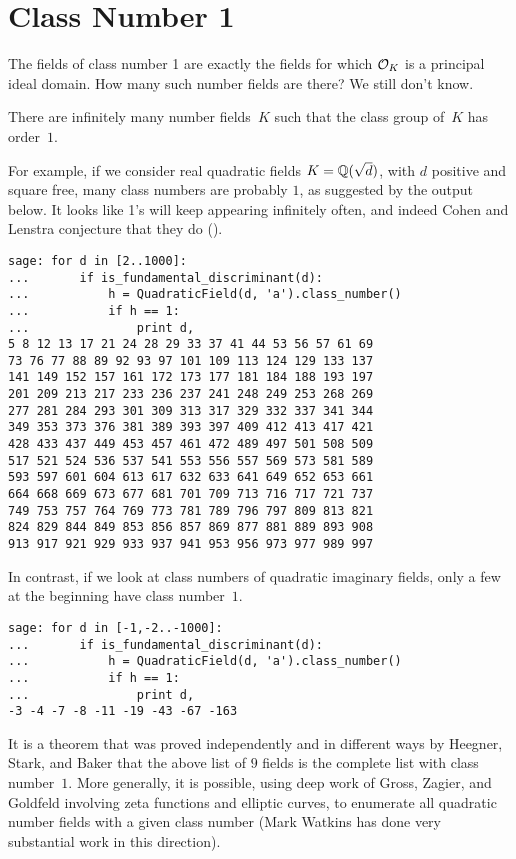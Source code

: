\section{Class Number 1}\label{sec:cn1}
The fields of class number 1 are exactly the fields for
which $\mathcal{O}_K$ is a principal ideal domain.  How many such
number fields are there?   We still don't know.
\begin{conjecture}
  There are infinitely many number fields~$K$ such that the class
  group of~$K$ has order~$1$.
\end{conjecture}
For example, if we consider real quadratic fields $K=\mathbb{Q}(\sqrt{d})$,
with $d$ positive and square free, many class numbers are probably $1$,
as suggested by the \magma{} output below.
It looks like 1's will keep appearing infinitely often, and indeed
Cohen and Lenstra conjecture that they do (\cite{cohen-lenstra:heuristics}).  
\begin{verbatim}
sage: for d in [2..1000]:
...       if is_fundamental_discriminant(d):
...           h = QuadraticField(d, 'a').class_number()
...           if h == 1:
...               print d, 
5 8 12 13 17 21 24 28 29 33 37 41 44 53 56 57 61 69 
73 76 77 88 89 92 93 97 101 109 113 124 129 133 137 
141 149 152 157 161 172 173 177 181 184 188 193 197 
201 209 213 217 233 236 237 241 248 249 253 268 269 
277 281 284 293 301 309 313 317 329 332 337 341 344 
349 353 373 376 381 389 393 397 409 412 413 417 421 
428 433 437 449 453 457 461 472 489 497 501 508 509 
517 521 524 536 537 541 553 556 557 569 573 581 589 
593 597 601 604 613 617 632 633 641 649 652 653 661 
664 668 669 673 677 681 701 709 713 716 717 721 737 
749 753 757 764 769 773 781 789 796 797 809 813 821 
824 829 844 849 853 856 857 869 877 881 889 893 908 
913 917 921 929 933 937 941 953 956 973 977 989 997
\end{verbatim}
In contrast, if we look at class numbers of quadratic imaginary fields,
only a few at the beginning have class number~$1$.  
\begin{verbatim}
sage: for d in [-1,-2..-1000]:
...       if is_fundamental_discriminant(d):
...           h = QuadraticField(d, 'a').class_number()
...           if h == 1:
...               print d,
-3 -4 -7 -8 -11 -19 -43 -67 -163
\end{verbatim}
It is a theorem that was proved independently and in different ways by
Heegner, Stark, and Baker that the above list of $9$ fields is the
complete list with class number~$1$.  More generally, it is possible,
using deep work of Gross, Zagier, and Goldfeld involving zeta
functions and elliptic curves, to enumerate all quadratic number
fields with a given class number (Mark Watkins has done very
substantial work in this direction).


